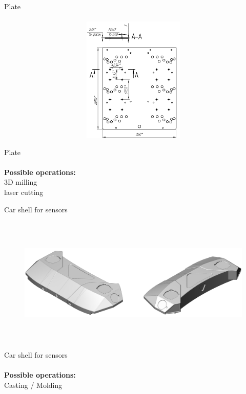 \documentclass[aspectratio=169]{beamer}
\begin{document}
\begin{frame}[c]{Plate}
\framesubtitle{}
    \vspace{-0.6cm}
    \begin{figure}[H]
        \centering\includegraphics[height=6cm,width=1\textwidth,keepaspectratio]{stri_2.png}
        \label{fig:stri_2.png}
    \end{figure}
\end{frame}

\begin{frame}[c]{Plate}
    \framesubtitle{}
        \LARGE \centering
        \textbf{Possible operations: } \\ 
        3D milling\\
        laser cutting\\
    \end{frame}

\begin{frame}[c]{Car shell for sensors}
\framesubtitle{}
    \vspace{-0.6cm}
    \begin{figure}[H]
        \centering\includegraphics[height=6cm,width=1\textwidth,keepaspectratio]{Image_15.jpg}
        \label{fig:Image_15.jpg}
    \end{figure}
\end{frame}

\begin{frame}[c]{Car shell for sensors}
    \framesubtitle{}
        \LARGE \centering
        \textbf{Possible operations: } \\ 
        Casting / Molding\\
    \end{frame}
\end{document}
